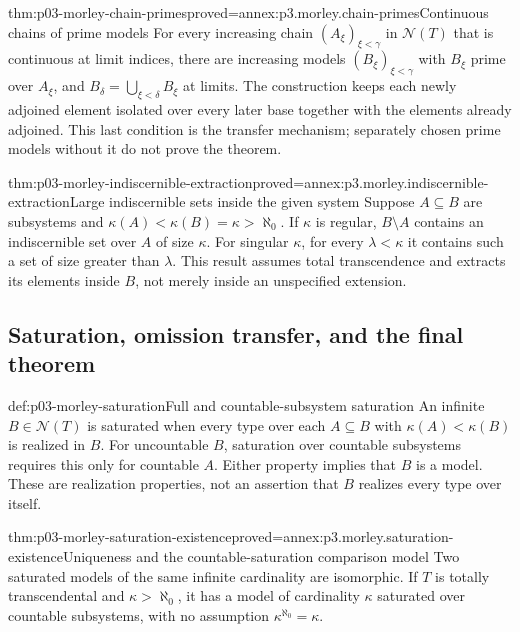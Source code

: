 \begin{hbtheorem}{thm:p03-morley-chain-primes}{proved=annex:p3.morley.chain-primes}{Continuous chains of prime models}
For every increasing chain \((A_\xi)_{\xi<\gamma}\) in
\(\mathcal N(T)\) that is continuous at limit indices, there are
increasing models \((B_\xi)_{\xi<\gamma}\) with \(B_\xi\)
prime over \(A_\xi\), and
\(B_\delta=\bigcup_{\xi<\delta}B_\xi\) at limits.
The construction keeps each newly adjoined element isolated over
every later base together with the elements already adjoined.
This last condition is the transfer mechanism; separately chosen
prime models without it do not prove the theorem.
\end{hbtheorem}

\begin{hbtheorem}{thm:p03-morley-indiscernible-extraction}{proved=annex:p3.morley.indiscernible-extraction}{Large indiscernible sets inside the given system}
Suppose \(A\subseteq B\) are subsystems and
\(\kappa(A)<\kappa(B)=\kappa>\aleph_0\).
If \(\kappa\) is regular, \(B\setminus A\) contains an
indiscernible set over \(A\) of size \(\kappa\).
For singular \(\kappa\), for every \(\lambda<\kappa\) it
contains such a set of size greater than \(\lambda\).
This result assumes total transcendence and extracts its elements
inside \(B\), not merely inside an unspecified extension.
\end{hbtheorem}

\subsection{Saturation, omission transfer, and the final theorem}
\label{sec:p03-morley-saturation-transfer}

\begin{hbdefinition}{def:p03-morley-saturation}{Full and countable-subsystem saturation}
An infinite \(B\in\mathcal N(T)\) is saturated when every type
over each \(A\subseteq B\) with \(\kappa(A)<\kappa(B)\)
is realized in \(B\). For uncountable \(B\), saturation over
countable subsystems requires this only for countable \(A\).
Either property implies that \(B\) is a model. These are
realization properties, not an assertion that \(B\) realizes
every type over itself.
\end{hbdefinition}

\begin{hbtheorem}{thm:p03-morley-saturation-existence}{proved=annex:p3.morley.saturation-existence}{Uniqueness and the countable-saturation comparison model}
Two saturated models of the same infinite cardinality are
isomorphic. If \(T\) is totally transcendental and
\(\kappa>\aleph_0\), it has a model of cardinality \(\kappa\)
saturated over countable subsystems, with no assumption
\(\kappa^{\aleph_0}=\kappa\).
\end{hbtheorem}

